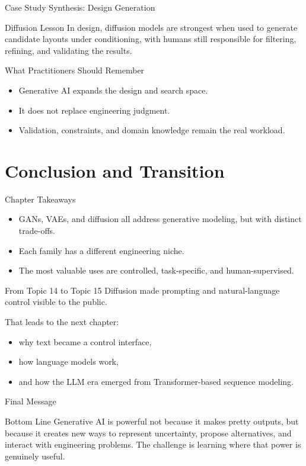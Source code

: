 \documentclass[12pt]{beamer}
\begin{document}
\begin{frame}{Case Study Synthesis: Design Generation}
  \begin{examplebox}{Diffusion Lesson}
    In design, diffusion models are strongest when used to generate candidate layouts under conditioning, with humans still responsible for filtering, refining, and validating the results.
  \end{examplebox}
\end{frame}

\begin{frame}{What Practitioners Should Remember}
  \begin{itemize}
    \item Generative AI expands the design and search space.
    \item It does not replace engineering judgment.
    \item Validation, constraints, and domain knowledge remain the real workload.
  \end{itemize}
\end{frame}

\section{Conclusion and Transition}

\begin{frame}{Chapter Takeaways}
  \begin{itemize}
    \item GANs, VAEs, and diffusion all address generative modeling, but with distinct trade-offs.
    \item Each family has a different engineering niche.
    \item The most valuable uses are controlled, task-specific, and human-supervised.
  \end{itemize}
\end{frame}

\begin{frame}{From Topic 14 to Topic 15}
  Diffusion made prompting and natural-language control visible to the public.

  That leads to the next chapter:
  \begin{itemize}
    \item why text became a control interface,
    \item how language models work,
    \item and how the LLM era emerged from Transformer-based sequence modeling.
  \end{itemize}
\end{frame}

\begin{frame}{Final Message}
  \begin{conceptbox}{Bottom Line}
    Generative AI is powerful not because it makes pretty outputs, but because it creates new ways to represent uncertainty, propose alternatives, and interact with engineering problems. The challenge is learning where that power is genuinely useful.
  \end{conceptbox}
\end{frame}
\end{document}
